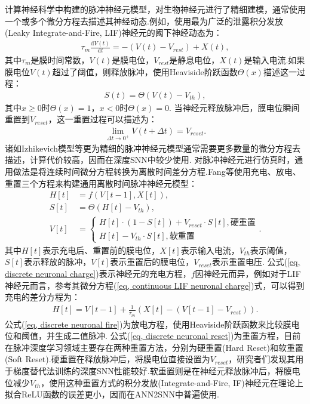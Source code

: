\documentclass{SCIS2020cn}
\begin{document}
计算神经科学中构建的脉冲神经元模型，对生物神经元进行了精细建模，通常使用一个或多个微分方程去描述其神经动态.例如，使用最为广泛的泄露积分发放(Leaky Integrate-and-Fire, LIF)神经元的阈下神经动态为：
\begin{eqnarray}
	\tau_{m} \frac{\mathrm{d}V(t)}{\mathrm{d}t} = -(V(t) - V_{rest}) + X(t),
	\label{eq, continuous LIF neuronal charge}
\end{eqnarray}
其中$\tau_{m}$是膜时间常数，$V(t)$是膜电位，$V_{rest}$是静息电位，$X(t)$是输入电流.如果膜电位$V(t)$超过了阈值，则释放脉冲，使用Heaviside阶跃函数$\Theta(x)$描述这一过程：
\begin{eqnarray}
	S(t) = \Theta(V(t) - V_{th}),
	\label{eq, continuous neuronal fire}
\end{eqnarray}
其中$x \ge 0$时$\Theta(x) = 1$，$x < 0$时$\Theta(x) = 0$.
当神经元释放脉冲后，膜电位瞬间重置到$V_{reset}$，这一重置过程可以描述为：
\begin{eqnarray}
\lim_{\Delta t \rightarrow 0^{+}} V(t + \Delta t) = V_{reset}. \label{eq, continuous neuronal reset}
\end{eqnarray}
诸如Izhikevich模型\cite{izhikevich2003simple}等更为精细的脉冲神经元模型通常需要更多数量的微分方程去描述，计算代价较高，因而在深度SNN中较少使用.
对脉冲神经元进行仿真时，通用做法是将连续时间微分方程转换为离散时间差分方程.Fang等\cite{fang2021incorporating, doi:10.1126/sciadv.adi1480}使用充电、放电、重置三个方程来构建通用离散时间脉冲神经元模型：
\begin{align}
	H[t] &= f(V[t-1], X[t]), \label{eq, discrete neuronal charge}\\
	S[t] &= \Theta(H[t] - V_{th}), \label{eq, discrete neuronal fire}\\
	V[t] &= \begin{cases}
		H[t] \cdot (1 - S[t]) + V_{reset} \cdot S[t], \text{硬重置}\\
		H[t] - V_{th} \cdot S[t], \text{软重置}
	\end{cases}. \label{eq, discrete neuronal reset}
\end{align}
其中$H[t]$表示充电后、重置前的膜电位，$X[t]$表示输入电流，$V_{th}$表示阈值，$S[t]$表示释放的脉冲，$V[t]$表示重置后的膜电位，$V_{reset}$表示重置电压.
公式(\ref{eq, discrete neuronal charge})表示神经元的充电方程，$f$因神经元而异，例如对于LIF神经元而言，参考其微分方程(\ref{eq, continuous LIF neuronal charge})式，可以得到充电的差分方程为：
\begin{eqnarray}
	H[t] = V[t-1] + \frac{1}{\tau_{m}}(X[t]-(V[t-1] - V_{rest})).
	\label{eq, discrete LIF neuronal charge}
\end{eqnarray}
公式(\ref{eq, discrete neuronal fire})为放电方程，使用Heaviside阶跃函数来比较膜电位和阈值，并生成二值脉冲.
公式(\ref{eq, discrete neuronal reset})为重置方程，目前在脉冲深度学习领域主要存在两种重置方法，分别为硬重置(Hard Reset)和软重置(Soft Reset).硬重置在释放脉冲后，将膜电位直接设置为$V_{reset}$，研究者们发现其用于梯度替代法训练的深度SNN性能较好\cite{ledinauskas2020training}.软重置则是在神经元释放脉冲后，将膜电位减少$V_{th}$，使用这种重置方式的积分发放(Integrate-and-Fire, IF)神经元在理论上拟合ReLU函数的误差更小\cite{Bodo2017Conversion}，因而在ANN2SNN中普遍使用.
\end{document}
